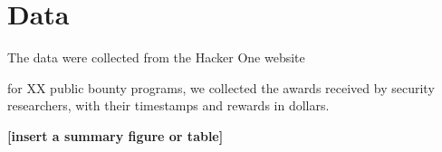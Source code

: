 \section{Data}
The data were collected from the Hacker One website

for XX public bounty programs, we collected the awards received by security researchers, with their timestamps and rewards in dollars.

{\bf [insert a summary figure or table]}






